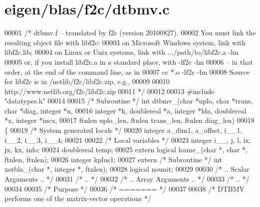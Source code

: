 \hypertarget{eigen_2blas_2f2c_2dtbmv_8c_source}{}\section{eigen/blas/f2c/dtbmv.c}
\label{eigen_2blas_2f2c_2dtbmv_8c_source}

\begin{DoxyCode}
00001 \textcolor{comment}{/* dtbmv.f -- translated by f2c (version 20100827).}
00002 \textcolor{comment}{   You must link the resulting object file with libf2c:}
00003 \textcolor{comment}{    on Microsoft Windows system, link with libf2c.lib;}
00004 \textcolor{comment}{    on Linux or Unix systems, link with .../path/to/libf2c.a -lm}
00005 \textcolor{comment}{    or, if you install libf2c.a in a standard place, with -lf2c -lm}
00006 \textcolor{comment}{    -- in that order, at the end of the command line, as in}
00007 \textcolor{comment}{        cc *.o -lf2c -lm}
00008 \textcolor{comment}{    Source for libf2c is in /netlib/f2c/libf2c.zip, e.g.,}
00009 \textcolor{comment}{}
00010 \textcolor{comment}{        http://www.netlib.org/f2c/libf2c.zip}
00011 \textcolor{comment}{*/}
00012 
00013 \textcolor{preprocessor}{#include "datatypes.h"}
00014 
00015 \textcolor{comment}{/* Subroutine */} \textcolor{keywordtype}{int} dtbmv\_(\textcolor{keywordtype}{char} *uplo, \textcolor{keywordtype}{char} *trans, \textcolor{keywordtype}{char} *diag, integer *n, 
00016     integer *k, doublereal *a, integer *lda, doublereal *x, integer *incx,
00017      ftnlen uplo\_len, ftnlen trans\_len, ftnlen diag\_len)
00018 \{
00019     \textcolor{comment}{/* System generated locals */}
00020     integer a\_dim1, a\_offset, i\_\_1, i\_\_2, i\_\_3, i\_\_4;
00021 
00022     \textcolor{comment}{/* Local variables */}
00023     integer i\_\_, j, l, ix, jx, kx, info;
00024     doublereal temp;
00025     \textcolor{keyword}{extern} logical lsame\_(\textcolor{keywordtype}{char} *, \textcolor{keywordtype}{char} *, ftnlen, ftnlen);
00026     integer kplus1;
00027     \textcolor{keyword}{extern} \textcolor{comment}{/* Subroutine */} \textcolor{keywordtype}{int} xerbla\_(\textcolor{keywordtype}{char} *, integer *, ftnlen);
00028     logical nounit;
00029 
00030 \textcolor{comment}{/*     .. Scalar Arguments .. */}
00031 \textcolor{comment}{/*     .. */}
00032 \textcolor{comment}{/*     .. Array Arguments .. */}
00033 \textcolor{comment}{/*     .. */}
00034 
00035 \textcolor{comment}{/*  Purpose */}
00036 \textcolor{comment}{/*  ======= */}
00037 
00038 \textcolor{comment}{/*  DTBMV  performs one of the matrix-vector operations */}

\end{DoxyCode}
